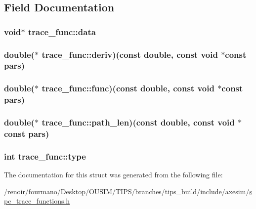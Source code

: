\subsection{Field Documentation}
\hypertarget{structtrace__func_aa610d641940ef4a567aef884dd0b32da}{
\subsubsection[{data}]{\setlength{\rightskip}{0pt plus 5cm}void$\ast$ {\bf trace\_\-func::data}}}
\label{structtrace__func_aa610d641940ef4a567aef884dd0b32da}
\hypertarget{structtrace__func_acdda34da0c92344832184081c6f41718}{
\subsubsection[{deriv}]{\setlength{\rightskip}{0pt plus 5cm}double($\ast$ {\bf trace\_\-func::deriv})(const double, const void $\ast$const pars)}}
\label{structtrace__func_acdda34da0c92344832184081c6f41718}
\hypertarget{structtrace__func_a7c1a538b7ae1293d6e0fc1bdd4c2739c}{
\subsubsection[{func}]{\setlength{\rightskip}{0pt plus 5cm}double($\ast$ {\bf trace\_\-func::func})(const double, const void $\ast$const pars)}}
\label{structtrace__func_a7c1a538b7ae1293d6e0fc1bdd4c2739c}
\hypertarget{structtrace__func_a0d9e428a3734aaad170ce069be219f32}{
\subsubsection[{path\_\-len}]{\setlength{\rightskip}{0pt plus 5cm}double($\ast$ {\bf trace\_\-func::path\_\-len})(const double, const void $\ast$const pars)}}
\label{structtrace__func_a0d9e428a3734aaad170ce069be219f32}
\hypertarget{structtrace__func_aedeeb1989f1f33f55e7c641f9510864e}{
\subsubsection[{type}]{\setlength{\rightskip}{0pt plus 5cm}int {\bf trace\_\-func::type}}}
\label{structtrace__func_aedeeb1989f1f33f55e7c641f9510864e}


The documentation for this struct was generated from the following file:\begin{DoxyCompactItemize}
\item 
/renoir/fourmano/Desktop/OUSIM/TIPS/branches/tips\_\-build/include/axesim/\hyperlink{spc__trace__functions_8h}{spc\_\-trace\_\-functions.h}\end{DoxyCompactItemize}
